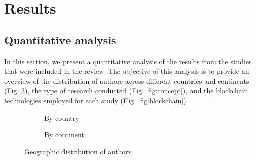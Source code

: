 \section{Results}
\subsection{Quantitative analysis}
In this section, we present a quantitative analysis of the results from the studies that were included in the review. The objective of this analysis is to provide an overview of the distribution of authors across different countries and continents (Fig. \ref{fig:geo}), the type of research conducted (Fig. \ref{fig:concept}), and the blockchain technologies employed for each study (Fig. \ref{fig:blockchain}).

\begin{figure}
\centering
\begin{subfigure}{.5\textwidth}
    \centering
    \caption{By country}
    \label{fig:geo-country}
\end{subfigure}%
\begin{subfigure}{.5\textwidth}
    \centering
    \caption{By continent}
    \label{fig:geo-continent}
\end{subfigure}%
\caption{Geographic distribution of authors}
\label{fig:geo}
\end{figure}

